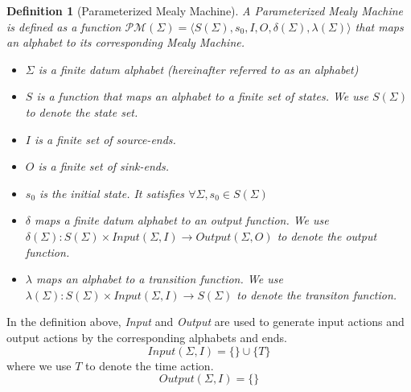 \documentclass[conference, a4paper]{IEEEtran}
\newtheorem{definition}{Definition}
\begin{document}
\begin{definition}[Parameterized Mealy Machine]
  A \emph{Parameterized Mealy Machine} is defined as a function $\mathcal{PM}(\Sigma)=\langle
  S(\Sigma), s_0, I, O, \delta(\Sigma), \lambda(\Sigma)\rangle$ that maps an
  alphabet to its corresponding Mealy Machine. 
  \begin{itemize}
    \item[-] $\Sigma$ is a \emph{finite} datum alphabet (hereinafter referred to as an alphabet)
    \item[-] $S$ is a function that maps an alphabet to a \emph{finite} set of
      states. We use $S(\Sigma)$ to denote the state set.
    \item[-] $I$ is a finite set of source-ends.
    \item[-] $O$ is a finite set of sink-ends.
    \item[-] $s_0$ is the initial state. It satisfies $\forall \Sigma,s_0\in S(\Sigma)$
    \item[-] $\delta$ maps a \emph{finite} datum alphabet to an \emph{output function}. We use
      $\delta(\Sigma):S(\Sigma)\times Input(\Sigma,I)\rightarrow Output(\Sigma, O)$ to denote the output function.
    \item[-] $\lambda$ maps an alphabet to a \emph{transition function}. We use
      $\lambda(\Sigma):S(\Sigma)\times Input(\Sigma,I)\rightarrow S(\Sigma)$ to denote the transiton
      function.
  \end{itemize}
\end{definition}

In the definition above, \emph{Input} and \emph{Output} are used to generate input actions and output actions by the corresponding alphabets and ends.
\[
Input(\Sigma,I)=\{\}\cup\{T\}
\]
where we use $T$ to denote the time action.
\[
Output(\Sigma,I)=\{\}
\]
\end{document}
